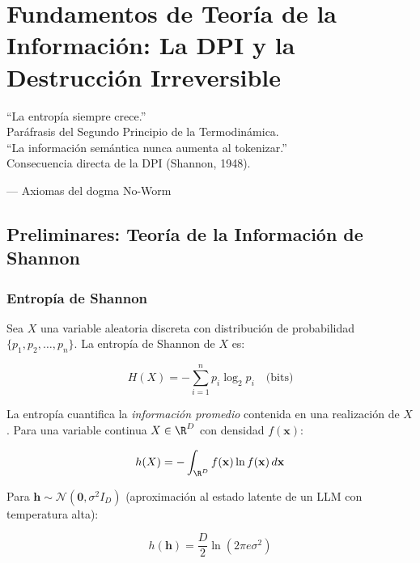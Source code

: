 \chapter{Fundamentos de Teoría de la Información: La DPI y la Destrucción Irreversible}
\label{ch:dpi}

\epigraph{``La entropía siempre crece.''\\
Paráfrasis del Segundo Principio de la Termodinámica.\\[0.3cm]
``La información semántica nunca aumenta al tokenizar.''\\
Consecuencia directa de la DPI (Shannon, 1948).}{--- Axiomas del dogma No-Worm}

\section{Preliminares: Teoría de la Información de Shannon}

\subsection{Entropía de Shannon}

Sea $X$ una variable aleatoria discreta con distribución de probabilidad
$\{p_1, p_2, \ldots, p_n\}$. La entropía de Shannon de $X$ es:

\begin{equation}
H(X) = -\sum_{i=1}^{n} p_i \log_2 p_i \quad \text{(bits)}
\label{eq:shannon_entropy}
\end{equation}

La entropía cuantifica la \textit{información promedio} contenida en una realización
de $X$. Para una variable continua $X \in \R^D$ con densidad $f(\mathbf{x})$:

\begin{equation}
h(X) = -\int_{\R^D} f(\mathbf{x}) \ln f(\mathbf{x}) \, d\mathbf{x}
\label{eq:differential_entropy}
\end{equation}

Para $\mathbf{h} \sim \mathcal{N}(\mathbf{0}, \sigma^2 I_D)$ (aproximación al
estado latente de un LLM con temperatura alta):

\begin{equation}
h(\mathbf{h}) = \frac{D}{2} \ln(2\pi e \sigma^2)
\end{equation}

